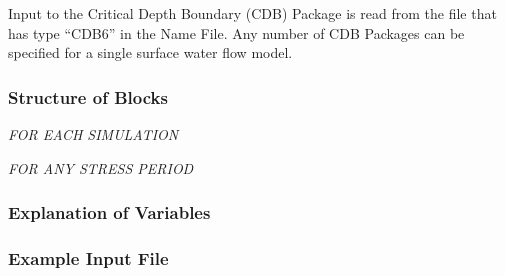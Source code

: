 Input to the Critical Depth Boundary (CDB) Package is read from the file that has type ``CDB6'' in the Name File.  Any number of CDB Packages can be specified for a single surface water flow model.

\vspace{5mm}
\subsubsection{Structure of Blocks}
\vspace{5mm}

\noindent \textit{FOR EACH SIMULATION}


\vspace{5mm}
\noindent \textit{FOR ANY STRESS PERIOD}

\packageperioddescription

\vspace{5mm}
\subsubsection{Explanation of Variables}
\begin{description}

\end{description}

\vspace{5mm}
\subsubsection{Example Input File}



